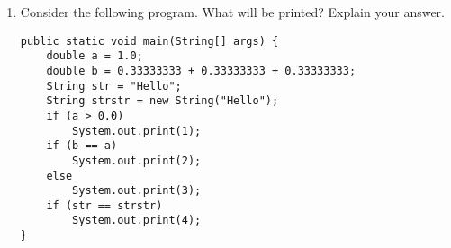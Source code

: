\Instructions
\begin{enumerate}
\item {} Consider the following program. What will be printed? Explain your answer.

\begin{lstlisting}
public static void main(String[] args) {
	double a = 1.0;
	double b = 0.33333333 + 0.33333333 + 0.33333333;
	String str = "Hello";
	String strstr = new String("Hello");
	if (a > 0.0)
    	System.out.print(1);
	if (b == a)
    	System.out.print(2);
	else 
    	System.out.print(3);
 	if (str == strstr)
    	System.out.print(4);
}
\end{lstlisting}

\end{enumerate}